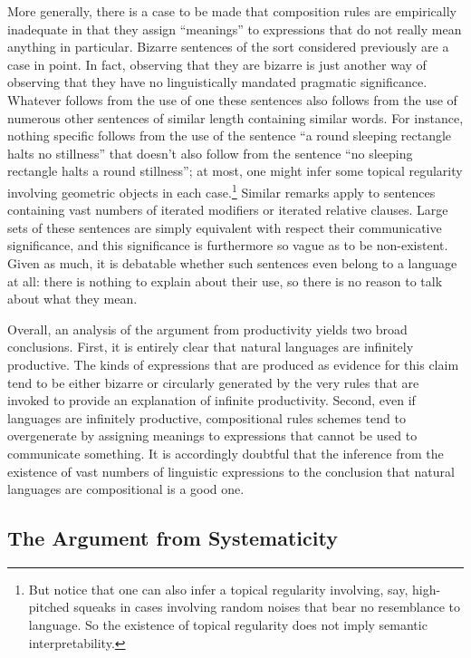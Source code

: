More generally, there is a case to be made that composition rules are empirically inadequate in that they assign ``meanings'' to expressions that do not really mean anything in particular. Bizarre sentences of the sort considered previously are a case in point. In fact, observing that they are bizarre is just another way of observing that they have no linguistically mandated pragmatic significance. Whatever follows from the use of one these sentences also follows from the use of numerous other sentences of similar length containing similar words. For instance, nothing specific follows from the use of the sentence ``a round sleeping rectangle halts no stillness'' that doesn't also follow from the sentence ``no sleeping rectangle halts a round stillness''; at most, one might infer some topical regularity involving geometric objects in each case.\footnote{But notice that one can also infer a topical regularity involving, say, high-pitched squeaks in cases involving random noises that bear no resemblance to language. So the existence of topical regularity does not imply semantic interpretability.} Similar remarks apply to sentences containing vast numbers of iterated modifiers or iterated relative clauses. Large sets of these sentences are simply equivalent with respect their communicative significance, and this significance is furthermore so vague as to be non-existent. Given as much, it is debatable whether such sentences even belong to a language at all: there is nothing to explain about their use, so there is no reason to talk about what they mean. 

Overall, an analysis of the argument from productivity yields two broad conclusions. First, it is entirely clear that natural languages are infinitely productive. The kinds of expressions that are produced as evidence for this claim tend to be either bizarre or circularly generated by the very rules that are invoked to provide an explanation of infinite productivity. Second, even if languages are infinitely productive, compositional rules schemes tend to overgenerate by assigning meanings to expressions that cannot be used to communicate something. It is accordingly doubtful that the inference from the existence of vast numbers of linguistic expressions to the conclusion that natural languages are compositional is a good one. 

\subsection{The Argument from Systematicity}


